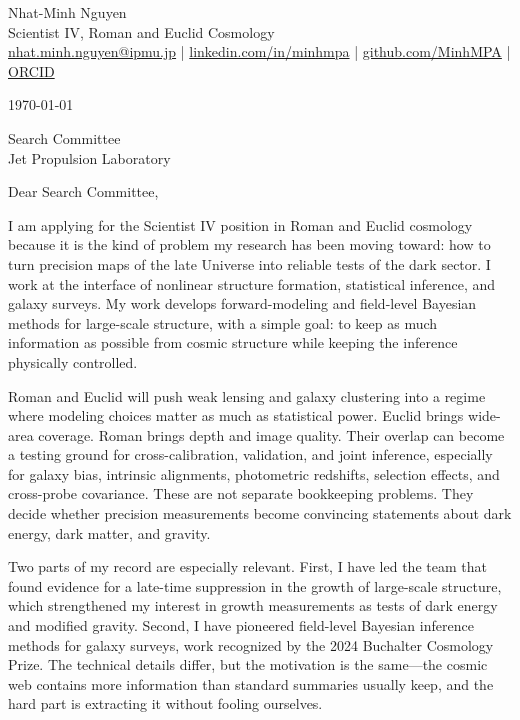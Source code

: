 \documentclass[11pt,letterpaper]{article}
\begin{document}
\begin{center}
    {\Huge Nhat-Minh Nguyen} \\
    \vspace{0.06cm}
    {\color{UI_blue} \Large Scientist IV, Roman and Euclid Cosmology} \\
    \vspace{0.08cm}
    \large
    \href{mailto:nhat.minh.nguyen@ipmu.jp}{nhat.minh.nguyen@ipmu.jp}
    \quad | \quad
    \href{https://linkedin.com/in/minhmpa}{linkedin.com/in/minhmpa}
    \quad | \quad
    \href{https://github.com/MinhMPA}{github.com/MinhMPA}
    \quad | \quad
    \href{https://orcid.org/0000-0002-2542-7233}{ORCID}

\vspace{0.05cm}
{\color{UI_blue} \hrulefill}
\end{center}

\justify
\setlength{\parindent}{0pt}
\setlength{\parskip}{8.5pt}
\vspace{-0.05cm}

\today

Search Committee \\
Jet Propulsion Laboratory

Dear Search Committee,

I am applying for the Scientist IV position in Roman and Euclid cosmology because it is the kind of problem my research has been moving toward: how to turn precision maps of the late Universe into reliable tests of the dark sector. I work at the interface of nonlinear structure formation, statistical inference, and galaxy surveys. My work develops forward-modeling and field-level Bayesian methods for large-scale structure, with a simple goal: to keep as much information as possible from cosmic structure while keeping the inference physically controlled.

Roman and Euclid will push weak lensing and galaxy clustering into a regime where modeling choices matter as much as statistical power. Euclid brings wide-area coverage. Roman brings depth and image quality. Their overlap can become a testing ground for cross-calibration, validation, and joint inference, especially for galaxy bias, intrinsic alignments, photometric redshifts, selection effects, and cross-probe covariance. These are not separate bookkeeping problems. They decide whether precision measurements become convincing statements about dark energy, dark matter, and gravity.

Two parts of my record are especially relevant. First, I have led the team that found evidence for a late-time suppression in the growth of large-scale structure, which strengthened my interest in growth measurements as tests of dark energy and modified gravity. Second, I have pioneered field-level Bayesian inference methods for galaxy surveys, work recognized by the 2024 Buchalter Cosmology Prize. The technical details differ, but the motivation is the same---the cosmic web contains more information than standard summaries usually keep, and the hard part is extracting it without fooling ourselves.
\end{document}
